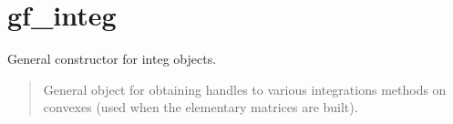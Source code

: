\documentclass[a4paper,11pt,english]{sphinxmanual}
\begin{document}
\section{gf\_integ}
\label{\detokenize{matlab_octave/cmdref_gf_integ:gf-integ}}\label{\detokenize{matlab_octave/cmdref_gf_integ::doc}}
\sphinxAtStartPar
{}

\begin{sphinxVerbatim}[commandchars=\\\{\}]
   
\end{sphinxVerbatim}

\sphinxAtStartPar
{}

\sphinxAtStartPar
General constructor for integ objects.
\begin{quote}

\sphinxAtStartPar
General object for obtaining handles to various integrations methods on
convexes (used when the elementary matrices are built).
\end{quote}
\end{document}
